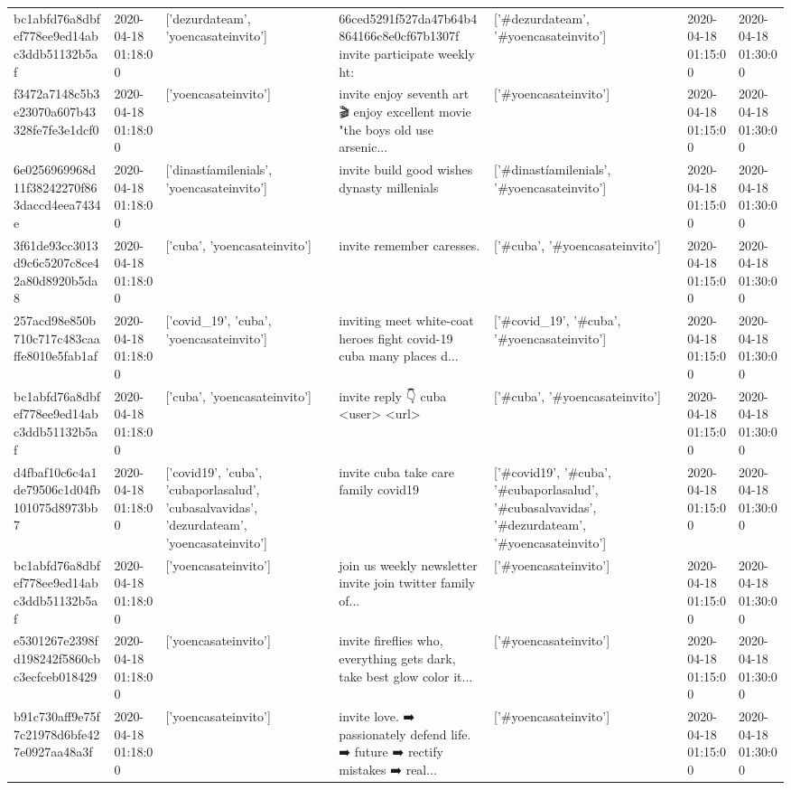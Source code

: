 \begin{tabular}{lllllll}
bc1abfd76a8dbfef778ee9ed14abc3ddb51132b5af & 2020-04-18 01:18:00 & ['dezurdateam', 'yoencasateinvito'] & 66ced5291f527da47b64b4864166c8e0cf67b1307f invite participate weekly ht: & ['#dezurdateam', '#yoencasateinvito'] & 2020-04-18 01:15:00 & 2020-04-18 01:30:00 \\
f3472a7148c5b3e23070a607b43328fe7fe3e1dcf0 & 2020-04-18 01:18:00 & ['yoencasateinvito'] & invite enjoy seventh art 🎬 enjoy excellent movie "the boys old use arsenic... & ['#yoencasateinvito'] & 2020-04-18 01:15:00 & 2020-04-18 01:30:00 \\
6e0256969968d11f38242270f863daccd4eea7434e & 2020-04-18 01:18:00 & ['dinastíamilenials', 'yoencasateinvito'] & invite build good wishes dynasty millenials & ['#dinastíamilenials', '#yoencasateinvito'] & 2020-04-18 01:15:00 & 2020-04-18 01:30:00 \\
3f61de93cc3013d9c6c5207c8ce42a80d8920b5da8 & 2020-04-18 01:18:00 & ['cuba', 'yoencasateinvito'] & invite remember caresses. & ['#cuba', '#yoencasateinvito'] & 2020-04-18 01:15:00 & 2020-04-18 01:30:00 \\
257acd98e850b710c717c483caaffe8010e5fab1af & 2020-04-18 01:18:00 & ['covid_19', 'cuba', 'yoencasateinvito'] & inviting meet white-coat heroes fight covid-19 cuba many places d... & ['#covid_19', '#cuba', '#yoencasateinvito'] & 2020-04-18 01:15:00 & 2020-04-18 01:30:00 \\
bc1abfd76a8dbfef778ee9ed14abc3ddb51132b5af & 2020-04-18 01:18:00 & ['cuba', 'yoencasateinvito'] & invite reply 👇 cuba <user> <url> & ['#cuba', '#yoencasateinvito'] & 2020-04-18 01:15:00 & 2020-04-18 01:30:00 \\
d4fbaf10c6c4a1de79506c1d04fb101075d8973bb7 & 2020-04-18 01:18:00 & ['covid19', 'cuba', 'cubaporlasalud', 'cubasalvavidas', 'dezurdateam', 'yoencasateinvito'] & invite cuba take care family covid19 & ['#covid19', '#cuba', '#cubaporlasalud', '#cubasalvavidas', '#dezurdateam', '#yoencasateinvito'] & 2020-04-18 01:15:00 & 2020-04-18 01:30:00 \\
bc1abfd76a8dbfef778ee9ed14abc3ddb51132b5af & 2020-04-18 01:18:00 & ['yoencasateinvito'] & join us weekly newsletter invite join twitter family of... & ['#yoencasateinvito'] & 2020-04-18 01:15:00 & 2020-04-18 01:30:00 \\
e5301267e2398fd198242f5860cbc3ecfceb018429 & 2020-04-18 01:18:00 & ['yoencasateinvito'] & invite fireflies who, everything gets dark, take best glow color it... & ['#yoencasateinvito'] & 2020-04-18 01:15:00 & 2020-04-18 01:30:00 \\
b91c730aff9e75f7c21978d6bfe427e0927aa48a3f & 2020-04-18 01:18:00 & ['yoencasateinvito'] & invite love. ➡️ passionately defend life. ➡️ future ➡️ rectify mistakes ➡️ real... & ['#yoencasateinvito'] & 2020-04-18 01:15:00 & 2020-04-18 01:30:00 \\

\end{tabular}
